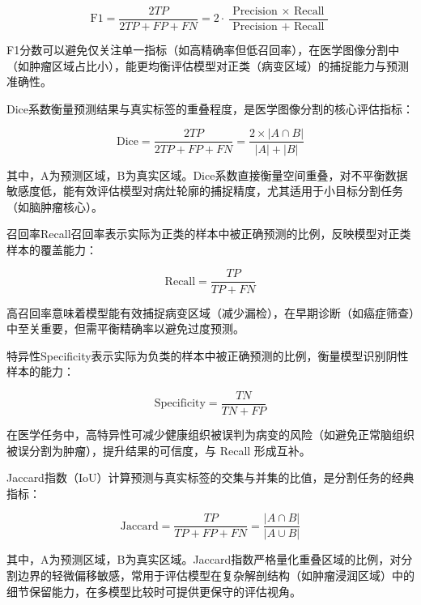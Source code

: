 \begin{equation}
    \mathrm{F} 1=\frac{2 T P}{2 T P+F P+F N}=2 \cdot \frac{\text { Precision } \times \text { Recall }}{\text { Precision }+ \text { Recall }}
\end{equation}

F1分数可以避免仅关注单一指标（如高精确率但低召回率），在医学图像分割中（如肿瘤区域占比小），能更均衡评估模型对正类（病变区域）的捕捉能力与预测准确性。

Dice系数衡量预测结果与真实标签的重叠程度，是医学图像分割的核心评估指标：

\begin{equation}
    \mathrm{Dice}=\frac{2 T P}{2 T P+F P+F N}=\frac{2 \times|A \cap B|}{|A|+|B|}
\end{equation}

其中，A为预测区域，B为真实区域。Dice系数直接衡量空间重叠，对不平衡数据敏感度低，能有效评估模型对病灶轮廓的捕捉精度，尤其适用于小目标分割任务（如脑肿瘤核心）。

召回率Recall召回率表示实际为正类的样本中被正确预测的比例，反映模型对正类样本的覆盖能力：

\begin{equation}
   \mathrm{Recall}=\frac{T P}{T P+F N} 
\end{equation}

高召回率意味着模型能有效捕捉病变区域（减少漏检），在早期诊断（如癌症筛查）中至关重要，但需平衡精确率以避免过度预测。

特异性Specificity表示实际为负类的样本中被正确预测的比例，衡量模型识别阴性样本的能力：

\begin{equation}
    \mathrm{Specificity}=\frac{T N}{T N+F P}
\end{equation}

在医学任务中，高特异性可减少健康组织被误判为病变的风险（如避免正常脑组织被误分割为肿瘤），提升结果的可信度，与 Recall 形成互补。

Jaccard指数（IoU）计算预测与真实标签的交集与并集的比值，是分割任务的经典指标：

\begin{equation}
    \mathrm{Jaccard}=\frac{T P}{T P+F P+F N}=\frac{|A \cap B|}{|A \cup B|}
\end{equation}

其中，A为预测区域，B为真实区域。Jaccard指数严格量化重叠区域的比例，对分割边界的轻微偏移敏感，常用于评估模型在复杂解剖结构（如肿瘤浸润区域）中的细节保留能力，在多模型比较时可提供更保守的评估视角。